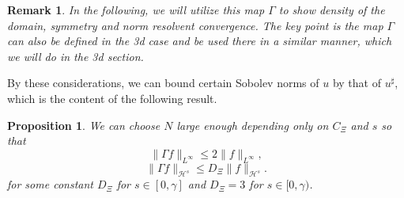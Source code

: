 \documentclass[11pt, oneside]{article}   	%
\newtheorem{proposition}[theorem]{Proposition}
\newtheorem{remark}[theorem]{Remark}
\newcommand{\ssp}{\mathscr{H}}
\begin{document}
\begin{remark}\upshape
In the following, we will utilize this map $\Gamma$ to show density of the domain, symmetry and norm resolvent convergence.  The key point is the map $\Gamma$ can also be defined in the 3d case and be used there in a similar manner, which we will do in the 3d section.
\end{remark}

By these considerations, we can bound certain Sobolev norms of $u$ by that of $u^\sharp$, which is the content of the following result.
\begin{proposition}
	\label{lem:gamma}We can choose $N$ large enough depending only on $C_{\Xi}$ and
	$s$ so that
	\begin{equation}
	\| \Gamma f \|_{L^{\infty}} \le 2 \| f \|_{L^{\infty}},
	\label{eq:gamma-bound-Linfty}
	\end{equation}
	\begin{equation}
	\| \Gamma f \|_{\ssp^s} \le D_\Xi \| f \|_{\ssp^s}.
	\label{eq:gamma-bound-sobolev}
	\end{equation}
	for some constant $D_\Xi$ for $s \in [0, \gamma]$  and  $D_\Xi=3$ for $s \in [0, \gamma)$.
\end{proposition}
\end{document}
